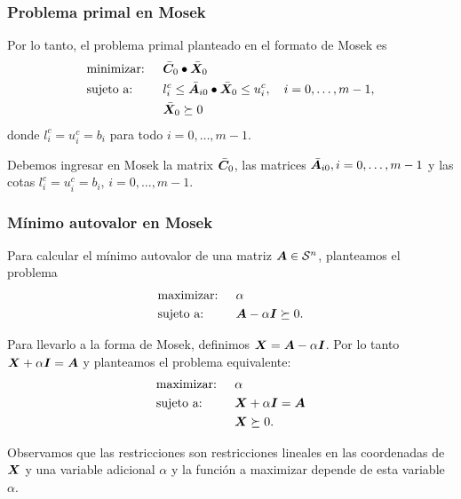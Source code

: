 \documentclass[aspectratio=169,12pt,spanish]{beamer}
\begin{document}
\begin{frame}
\frametitle{Problema primal en Mosek}

Por lo tanto, el problema primal planteado en el formato de Mosek es 
\begin{alignat*}{2}
  & \text{minimizar: } & & \bar {\bm{C}}_0 \bullet \bar {\bm{X}}_0 \\
  & \text{sujeto a: }  \quad & & l_i^c \le \bar {\bm{A}}_{i0} \bullet \bar {\bm{X}}_0 \le u_i^c, \quad i = 0, \dots, m-1, \\
  & & & \bar {\bm{X}}_0 \succeq 0
\end{alignat*}
donde $l_i^c = u_i^c = b_i$ para todo $i = 0, \dots, m-1$.

Debemos ingresar en Mosek la matrix $\bar {\bm{C}}_0$, las matrices $\bar {\bm{A}}_{i0}, i = 0, \dots, m-1$ y las cotas $l_i^c = u_i^c = b_i$, $i = 0, \dots, m-1$.
\end{frame}



\begin{frame}

\frametitle{Mínimo autovalor en Mosek}

Para calcular el mínimo autovalor de una matriz $\bm{A} \in {\mathcal S}^n$, planteamos el problema
\begin{alignat*}{2}
  & \text{maximizar: } & & \alpha \\
  & \text{sujeto a: } & & \bm{A} - \alpha \bm{I}  \succeq 0.
\end{alignat*}

Para llevarlo a la forma de Mosek, definimos $\bm{X} = \bm{A} - \alpha \bm{I}$. Por lo tanto $\bm{X} + \alpha \bm{I} = \bm{A}$ y planteamos el problema equivalente:
\begin{alignat*}{2}
  & \text{maximizar: } & & \alpha \\
  & \text{sujeto a: } & & \bm{X} + \alpha \bm{I} = \bm{A}   \\
  &&& \bm{X} \succeq 0.
\end{alignat*}

Observamos que las restricciones son restricciones lineales en las coordenadas de $\bm{X}$ y una variable adicional $\alpha$ y la función a maximizar depende de esta variable $\alpha$. 

\end{frame}

\end{document}
